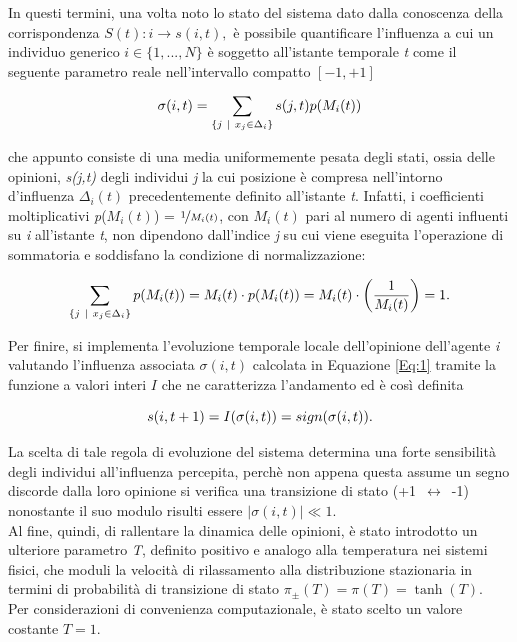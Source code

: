 \documentclass[letterpaper,10pt]{article}
\begin{document}
In questi termini, una volta noto lo stato del sistema dato dalla conoscenza della corrispondenza $S(t): i \rightarrow s(i,t), $ è possibile quantificare l'influenza a cui un individuo generico $\textit{i} \in \{1,...,\textit{N} \}$ è soggetto all'istante temporale \textit{t} come il seguente parametro reale nell'intervallo compatto $[-1,+1]$

\begin{equation}
    \sigma(i,t) = \sum_{ \{ j \ | \ x_{j} \in \Delta_{i} \} } s(j, t)p(M_{i}(t))
    \medskip
    \label{Eq:1}
\end{equation}

che appunto consiste di una media uniformemente pesata degli stati, ossia delle opinioni, \textit{s(j,t)} degli individui \textit{j} la cui posizione è compresa nell'intorno d'influenza $\Delta_{i}(t)$ precedentemente definito all'istante \textit{t}. Infatti, i coefficienti moltiplicativi \textit{p}($M_{i}(t)$) = $\nicefrac{1}{M_{i}(t)}$, con $M_{i}(t)$ pari al numero di agenti influenti su \textit{i} all'istante \textit{t}, non dipendono dall'indice \textit{j} su cui viene eseguita l'operazione di sommatoria e soddisfano la condizione di normalizzazione:

\begin{equation}
    \sum_{ \{ j \ | \ x_{j} \in \Delta_{i} \} } p(M_{i}(t)) = M_{i}(t) \cdot p(M_{i}(t)) =    M_{i}(t) \cdot \left ( \frac{1}{M_{i}(t)} \right ) = 1.
    \medskip
    \label{Eq:2}
\end{equation}

Per finire, si implementa l'evoluzione temporale locale dell'opinione dell'agente \textit{i} valutando l'influenza associata $\sigma(i,t)$  calcolata in Equazione \ref{Eq:1} tramite la funzione a valori interi $I$ che ne caratterizza l'andamento ed è così definita

\begin{equation}
    s(i,t+1) = I(\sigma(i,t)) = sign(\sigma(i,t)).
    \medskip
    \label{Eq:3}
\end{equation}

La scelta di tale regola di evoluzione del sistema determina una forte sensibilità degli individui all'influenza percepita, perchè non appena questa assume un segno discorde dalla loro opinione si verifica una transizione di stato \mbox{(+1 $\longleftrightarrow$ -1)} nonostante il suo modulo risulti essere $|\sigma(i,t)| \ll 1$.
\\ Al fine, quindi, di rallentare la dinamica delle opinioni, è stato introdotto un ulteriore parametro \textit{T}, definito positivo e analogo alla temperatura nei sistemi fisici, che moduli la velocità di rilassamento alla distribuzione stazionaria in termini di probabilità di transizione di stato $ \pi_{\pm}(T) = \pi(T) = \tanh (T)$.
\\ Per considerazioni di convenienza computazionale, è stato scelto un valore costante $T=1$.
\end{document}
